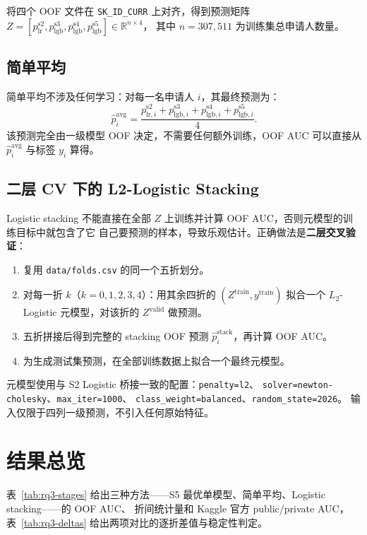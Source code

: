 \documentclass[11pt,UTF8,fontset=windows]{ctexrep}
\begin{document}
将四个 OOF 文件在 \texttt{SK\_ID\_CURR} 上对齐，得到预测矩阵
\(
Z = [p_{\text{lr}}^{\text{s2}}, p_{\text{lgb}}^{\text{s3}}, p_{\text{lgb}}^{\text{s4}}, p_{\text{lgb}}^{\text{s5}}]
\in \mathbb{R}^{n\times 4}
\)，
其中 $n = 307{,}511$ 为训练集总申请人数量。

\subsection{简单平均}

简单平均不涉及任何学习：对每一名申请人 $i$，其最终预测为：
\[
\hat p_i^{\text{avg}} = \frac{p_{\text{lr},i}^{\text{s2}} + p_{\text{lgb},i}^{\text{s3}}
+ p_{\text{lgb},i}^{\text{s4}} + p_{\text{lgb},i}^{\text{s5}}}{4}.
\]
该预测完全由一级模型 OOF 决定，不需要任何额外训练，OOF AUC 可以直接从
$\hat p_i^{\text{avg}}$ 与标签 $y_i$ 算得。

\subsection{二层 CV 下的 L2-Logistic Stacking}

Logistic stacking 不能直接在全部 $Z$ 上训练并计算 OOF AUC，否则元模型的训练目标中就包含了它
自己要预测的样本，导致乐观估计。正确做法是\textbf{二层交叉验证}：

\begin{enumerate}
\item 复用 \texttt{data/folds.csv} 的同一个五折划分。
\item 对每一折 $k$（$k=0,1,2,3,4$）：用其余四折的 $(Z^{\text{train}}, y^{\text{train}})$
拟合一个 $L_2$-Logistic 元模型，对该折的 $Z^{\text{valid}}$ 做预测。
\item 五折拼接后得到完整的 stacking OOF 预测 $\hat p_i^{\text{stack}}$，再计算 OOF AUC。
\item 为生成测试集预测，在全部训练数据上拟合一个最终元模型。
\end{enumerate}

元模型使用与 S2 Logistic 桥接一致的配置：\texttt{penalty=l2}、
\texttt{solver=newton-cholesky}、\texttt{max\_iter=1000}、
\texttt{class\_weight=balanced}、\texttt{random\_state=2026}。
输入仅限于四列一级预测，不引入任何原始特征。

\section{结果总览}

表~\ref{tab:rq3-stages} 给出三种方法——S5 最优单模型、简单平均、Logistic stacking——的 OOF AUC、
折间统计量和 Kaggle 官方 public/private AUC，表~\ref{tab:rq3-deltas} 给出两项对比的逐折差值与稳定性判定。
\end{document}
